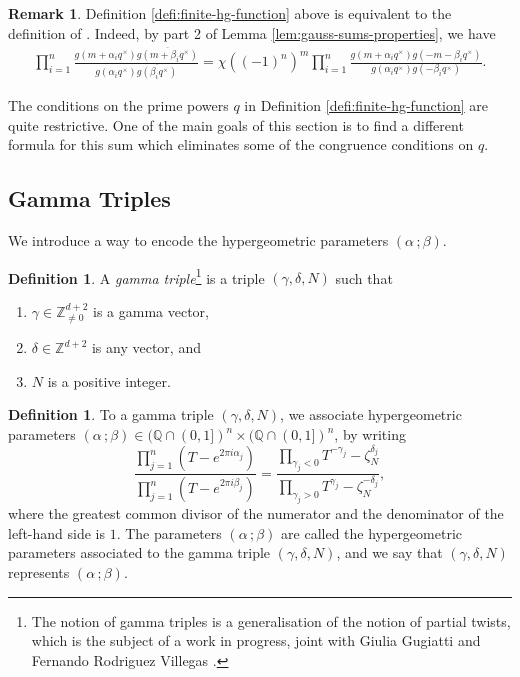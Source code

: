 \documentclass[11pt, reqno]{amsart}
\theoremstyle{plain}
\theoremstyle{definition}
\newtheorem{defi}[theo]{Definition}
\newtheorem{rem}[theo]{Remark}
\newcommand{\Z}{\mathbb{Z}}
\newcommand{\Q}{\mathbb{Q}}
\newcommand{\ga}{\gamma}
\newcommand{\be}{\beta}
\newcommand{\al}{\alpha}
\begin{document}
\begin{rem}
Definition \ref{defi:finite-hg-function} above is equivalent to the definition of \cite[Equation 10.1] {hypergeometric-survey}. Indeed, by part 2 of Lemma \ref{lem:gauss-sums-properties}, we have 
\begin{align*}
    \prod_{i=1}^n \frac{g(m+\alpha_iq^\times)\overline{g(m+\beta_iq^\times)}}{g(\alpha_iq^\times)\overline{g(\beta_i q^\times)}}= \chi((-1)^n)^m \prod_{i=1}^n \frac{g(m+\alpha_iq^\times)g(-m-\beta_iq^\times)}{g(\alpha_iq^\times)g(-\beta_i q^\times)} .
\end{align*}
\end{rem}

The conditions on the prime powers $q$ in Definition \ref{defi:finite-hg-function} are quite restrictive. One of the main goals of this section is to find a different formula for this sum which eliminates some of the congruence conditions on $q$.

\subsection{Gamma Triples}
We introduce a way to encode the hypergeometric parameters $(\alpha \, ;  \beta)$.  
\begin{defi}\label{def:gammma-triple}
    A \emph{gamma triple}\footnote{
    The notion of gamma triples is a generalisation of the notion of partial twists, which is the subject of a work in progress, joint with Giulia Gugiatti and Fernando Rodriguez Villegas \cite{partial-twists}.} is a triple $(\gamma,\delta,N)$ such that 
    \begin{enumerate}
    \item $\gamma \in \Z^{d+2}_{\neq0}$  is a gamma vector,
    \item $\delta \in \Z^{d+2}$ is any vector, and
    \item $N$ is a positive integer.
\end{enumerate}
\end{defi}

\begin{defi}
    To a gamma triple $(\gamma,\delta,N)$, we associate hypergeometric parameters $(\al \,;\be) \in (\Q \cap (0,1])^n\times (\Q \cap (0,1])^n $, by writing
    \begin{equation}\label{eq:gamma-delta}
    \frac{\prod_{j=1}^n (T- e^{2\pi i \alpha_j})}{\prod_{j=1}^n (T- e^{2\pi i \beta_j}) } = \frac{ \prod_{\ga_j< 0} T^{-\ga_j} - \zeta_N^{\delta_j}}{ \prod_{\ga_j>0} T^{\ga_j} - \zeta_N^{-\delta_j}} ,
    \end{equation}
    where the greatest common divisor of the numerator and the denominator of the left-hand side is $1$. 
    The parameters $(\al \,;\be)$ are called the hypergeometric parameters associated to the gamma triple $(\gamma,\delta,N)$, and we say that $(\ga,\delta,N)$ represents $(\al \,;\be)$.
\end{defi}
\end{document}

